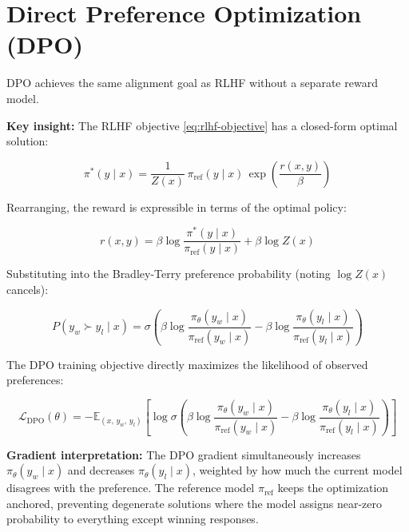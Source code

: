 \section{Direct Preference Optimization (DPO)}
\label{sec:app10-dpo}

DPO \autocite{rafailov2023direct} achieves the same alignment goal as RLHF without a separate reward model.

\textbf{Key insight:} The RLHF objective \eqref{eq:rlhf-objective} has a closed-form optimal solution:

\begin{equation}
\pi^*(y \mid x) = \frac{1}{Z(x)}\,\pi_{\text{ref}}(y \mid x)\,\exp\!\left(\frac{r(x,y)}{\beta}\right)
\label{eq:dpo-optimal}
\end{equation}

Rearranging, the reward is expressible in terms of the optimal policy:

\begin{equation}
r(x, y) = \beta \log \frac{\pi^*(y \mid x)}{\pi_{\text{ref}}(y \mid x)} + \beta \log Z(x)
\label{eq:dpo-reward}
\end{equation}

Substituting into the Bradley-Terry preference probability (noting $\log Z(x)$ cancels):

\begin{equation}
P(y_w \succ y_l \mid x) = \sigma\!\left(\beta \log \frac{\pi_\theta(y_w \mid x)}{\pi_{\text{ref}}(y_w \mid x)} - \beta \log \frac{\pi_\theta(y_l \mid x)}{\pi_{\text{ref}}(y_l \mid x)}\right)
\label{eq:dpo-preference}
\end{equation}

The DPO training objective directly maximizes the likelihood of observed preferences:

\begin{equation}
\mathcal{L}_{\text{DPO}}(\theta) = -\mathbb{E}_{(x,\, y_w,\, y_l)}\!\left[\log \sigma\!\left(
  \beta \log \frac{\pi_\theta(y_w \mid x)}{\pi_{\text{ref}}(y_w \mid x)}
  - \beta \log \frac{\pi_\theta(y_l \mid x)}{\pi_{\text{ref}}(y_l \mid x)}
\right)\right]
\label{eq:dpo-loss}
\end{equation}

\textbf{Gradient interpretation:} The DPO gradient simultaneously increases $\pi_\theta(y_w \mid x)$ and decreases $\pi_\theta(y_l \mid x)$, weighted by how much the current model disagrees with the preference. The reference model $\pi_{\text{ref}}$ keeps the optimization anchored, preventing degenerate solutions where the model assigns near-zero probability to everything except winning responses.

